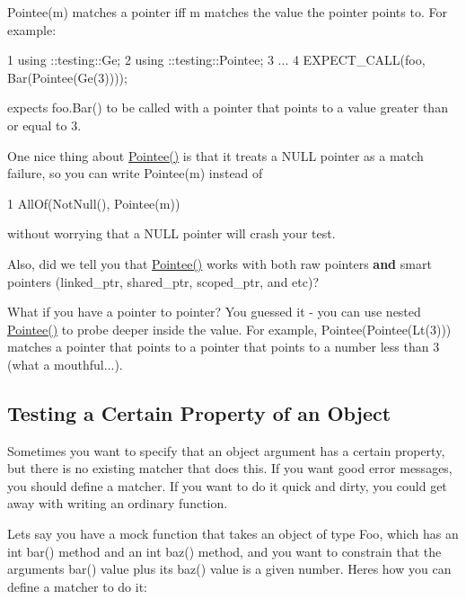 {\ttfamily Pointee(m)} matches a pointer iff {\ttfamily m} matches the value the pointer points to. For example\+:


\begin{DoxyCode}
1 using ::testing::Ge;
2 using ::testing::Pointee;
3 ...
4   EXPECT\_CALL(foo, Bar(Pointee(Ge(3))));
\end{DoxyCode}


expects {\ttfamily foo.\+Bar()} to be called with a pointer that points to a value greater than or equal to 3.

One nice thing about {\ttfamily \hyperlink{namespacetesting_a5122ca3533f3a00f67e146dd81f3b68c}{Pointee()}} is that it treats a {\ttfamily N\+U\+LL} pointer as a match failure, so you can write {\ttfamily Pointee(m)} instead of


\begin{DoxyCode}
1 AllOf(NotNull(), Pointee(m))
\end{DoxyCode}


without worrying that a {\ttfamily N\+U\+LL} pointer will crash your test.

Also, did we tell you that {\ttfamily \hyperlink{namespacetesting_a5122ca3533f3a00f67e146dd81f3b68c}{Pointee()}} works with both raw pointers {\bfseries and} smart pointers ({\ttfamily linked\+\_\+ptr}, {\ttfamily shared\+\_\+ptr}, {\ttfamily scoped\+\_\+ptr}, and etc)?

What if you have a pointer to pointer? You guessed it -\/ you can use nested {\ttfamily \hyperlink{namespacetesting_a5122ca3533f3a00f67e146dd81f3b68c}{Pointee()}} to probe deeper inside the value. For example, {\ttfamily Pointee(Pointee(\+Lt(3)))} matches a pointer that points to a pointer that points to a number less than 3 (what a mouthful...).

\subsection*{Testing a Certain Property of an Object}

Sometimes you want to specify that an object argument has a certain property, but there is no existing matcher that does this. If you want good error messages, you should define a matcher. If you want to do it quick and dirty, you could get away with writing an ordinary function.

Let\textquotesingle{}s say you have a mock function that takes an object of type {\ttfamily Foo}, which has an {\ttfamily int bar()} method and an {\ttfamily int baz()} method, and you want to constrain that the argument\textquotesingle{}s {\ttfamily bar()} value plus its {\ttfamily baz()} value is a given number. Here\textquotesingle{}s how you can define a matcher to do it\+:


